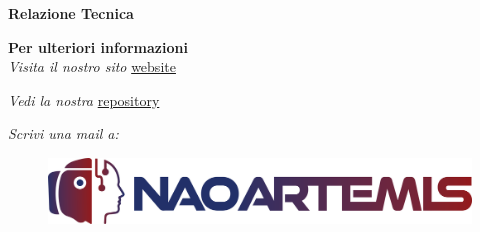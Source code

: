 \documentclass{optica-article}
\begin{document}
\begin{center}
    \Huge \textbf{Relazione Tecnica}
\end{center}
\author{\centering NaoChallenge 2025}
\bigskip

\noindent
\textbf{Per ulteriori informazioni} \\

\noindent\textit{Visita il nostro sito} \href{https://www.naoartemis.altervista.org/html}{website}

\noindent\textit{Vedi la nostra} \href{https://github.com/NaoArtemis/ChallengeNao25}{repository}

\noindent\textit{Scrivi una mail a: }

\bigskip

\begin{figure}
    \centering
    \includegraphics[scale=0.10]{figures/logo_v3.png}
    \label{fig:logo_con_scritta}
\end{figure}

\tableofcontents

\vspace{10pt}

\newpage
\end{document}
